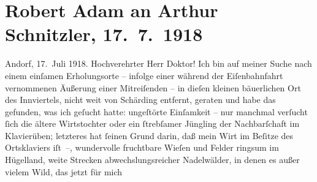 

         
         \newcommand{\erwaehntePersonen}{Personen:  Charles I von England,  Hintermayer,  Hintermayer}
         \newcommand{\erwaehnteInstitutionen}{}
         \newcommand{\erwaehnteOrte}{Orte: Andorf, Bayern, Innviertel, Schärding, Wien}
         \newcommand{\erwaehnteWerke}{Werke: David Copperfield, Robert, Siebenkäs}
               \section[Robert Adam an Arthur Schnitzler, 17. 7. 1918]{ Robert Adam an Arthur Schnitzler, 17. 7. 1918}\nopagebreak{}\rehead{ }\begin{ledgroupsized}[t]{13cm}\normalsize\beginnumbering \toendnotes[C]{\smallbreak\pagebreak[2]} 
\toendnotes[C]{\smallbreak}\pstart
           \raggedleft{}{\pb}Andorf, 17. Juli 1918.\pend
           \pstart{}Hochverehrter Herr Doktor!\pend\pstart
           Ich bin auf meiner Suche nach einem einſamen Erholungsorte – infolge einer während
               der Eiſenbahnfahrt vernommenen Äußerung einer Mitreiſenden – in dieſen kleinen
               bäuerlichen Ort des Innviertels, nicht weit von Schärding entfernt, geraten und habe das gefunden,
               was ich geſucht hatte: ungeſtörte Einſamkeit – nur manchmal verſucht ſich die ältere
                  Wirtstochter oder ein
               ſtrebſamer Jüngling der Nachbarſchaft im Klavierüben; letzteres hat ſeinen Grund
               darin, daß mein Wirt im Beſitze
               des Ortsklaviers iſt –, wundervolle fruchtbare Wieſen und Felder ringsum im
               Hügelland, weite Strec{\pb}ken
               abwechslungsreicher Nadelwälder, in denen es außer vielem Wild, das jetzt für mich

\end{ledgroupsized}

